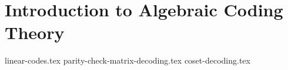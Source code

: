 \chapter{Introduction to Algebraic Coding Theory}
{linear-codes.tex}
{parity-check-matrix-decoding.tex}
{coset-decoding.tex}
